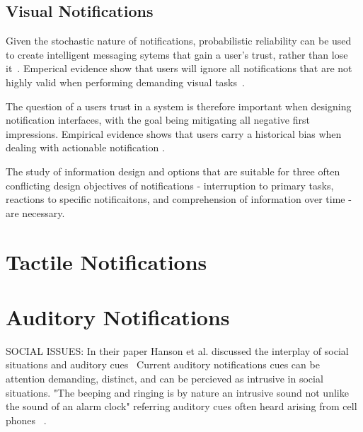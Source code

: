\subsection{                  Visual Notifications                            }

Given the stochastic nature of notifications, probabilistic reliability can be
used to create intelligent messaging sytems that gain a user's trust, rather
than lose it~\cite{leetiernan2001effective}. Emperical evidence show that users
will ignore all notifications that are not highly valid when performing
demanding visual tasks~\cite{maltz2000cue}.

The question of a users trust in a system is therefore important when designing
notification interfaces, with the goal being mitigating all negative first
impressions.  Empirical evidence shows that users carry a historical bias when
dealing with actionable notification \cite{leetiernan2001effective}.

The study of information design and options that are suitable for three often
conflicting design objectives of notifications - interruption to primary tasks,
reactions to specific notificaitons, and comprehension of information over time
- are necessary.






\section{                  Tactile Notifications                              }






\section{                  Auditory Notifications                             }

SOCIAL ISSUES: In their paper Hanson et al. discussed the interplay of social
situations and auditory cues~\cite{hansson2001subtle} Current auditory
notifications cues can be attention demanding, distinct, and can be percieved as
intrusive in social situations. "The beeping and ringing is by nature an
intrusive sound not unlike the sound of an alarm clock" referring auditory cues
often heard arising from cell phones  ~\cite{hansson2001subtle}.






